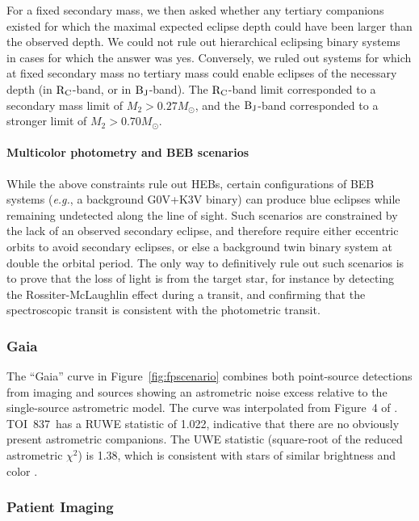 \documentclass[12pt,twocolumn,tighten]{aastex63}
\newcommand{\tn}{TOI~837} %
\begin{document}
For a fixed secondary mass, we then asked whether any tertiary
companions existed for which the maximal expected eclipse depth could
have been larger than the observed depth.  
We could not rule out hierarchical eclipsing binary systems in cases
for which the answer was yes.
Conversely, we ruled out systems for which at fixed
secondary mass no tertiary mass could enable eclipses of the necessary
depth (in ${\rm R_C}$-band, or in ${\rm B_J}$-band).  The ${\rm
R_C}$-band limit corresponded to a secondary mass limit of $M_2 > 0.27
M_\odot$, and the ${\rm B_J}$-band corresponded to a stronger limit of
$M_2 > 0.70 M_\odot$.


\paragraph{Multicolor photometry and BEB scenarios}

While the above constraints rule out HEBs, certain configurations of
BEB systems ({\it e.g.}, a background G0V+K3V binary) can produce blue
eclipses while remaining undetected along the line of sight.  Such
scenarios are constrained by the lack of an observed secondary
eclipse, and therefore require either eccentric orbits to avoid
secondary eclipses, or else a background twin binary system at double
the orbital period.  The only way to definitively rule out such
scenarios is to prove that the loss of light is from the target star,
for instance by detecting the Rossiter-McLaughlin effect during a
transit, and confirming that the spectroscopic transit is consistent
with the photometric transit.


\subsubsection{Gaia}

The ``Gaia'' curve in Figure~\ref{fig:fpscenario} combines both
point-source detections from imaging and sources showing an
astrometric noise excess relative to the single-source astrometric
model.  The curve was interpolated from Figure~4 of
\citet{rizzuto_zeitVIII_2018}.  \tn\ has a RUWE statistic of 1.022,
indicative that there are no obviously present astrometric companions.
The UWE statistic (square-root of the reduced astrometric $\chi^2$) is
1.38, which is consistent with stars of similar brightness and color
\citep[][Appendix A]{lindegren_gaiasoln_2018}.


\subsubsection{Patient Imaging}
\end{document}
